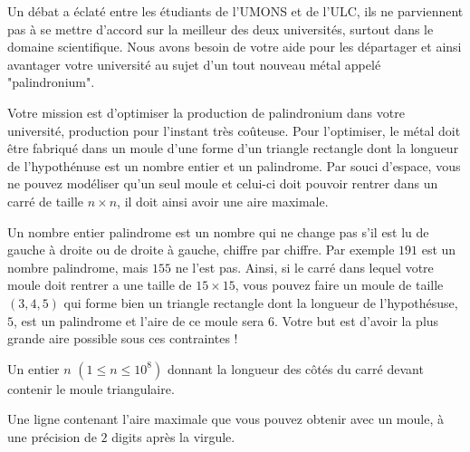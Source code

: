 \problemname{\problemyamlname}

Un débat a éclaté entre les étudiants de l'UMONS et de l'ULC, ils ne parviennent pas à se mettre d'accord sur la meilleur des deux universités, surtout dans le domaine scientifique. Nous avons besoin de votre aide pour les départager et ainsi avantager votre université au sujet d'un tout nouveau métal appelé "palindronium".

Votre mission est d'optimiser la production de palindronium dans votre université, production pour l'instant très coûteuse. Pour l'optimiser, le métal doit être fabriqué dans un moule d'une forme d'un triangle rectangle dont la longueur de l'hypothénuse est un nombre entier et un palindrome. Par souci d'espace, vous ne pouvez modéliser qu'un seul moule et celui-ci doit pouvoir rentrer dans un carré de taille $n\times n$, il doit ainsi avoir une aire maximale.

Un nombre entier palindrome est un nombre qui ne change pas s'il est lu de gauche à droite ou de droite à gauche, chiffre par chiffre. Par exemple $191$ est un nombre palindrome, mais $155$ ne l'est pas. Ainsi, si le carré dans lequel votre moule doit rentrer a une taille de $15\times 15$, vous pouvez faire un moule de taille $(3,4,5)$ qui forme bien un triangle rectangle dont la longueur de l'hypothésuse, $5$, est un palindrome et l'aire de ce moule sera $6$. Votre but est d'avoir la plus grande aire possible sous ces contraintes !

\begin{Input}
    Un entier $n$ $(1 \leq n \leq 10^8)$ donnant la longueur des côtés du carré devant contenir le moule triangulaire.
\end{Input}

\begin{Output}
    Une ligne contenant l'aire maximale que vous pouvez obtenir avec un moule, à une précision de $2$ digits après la virgule.
\end{Output}
